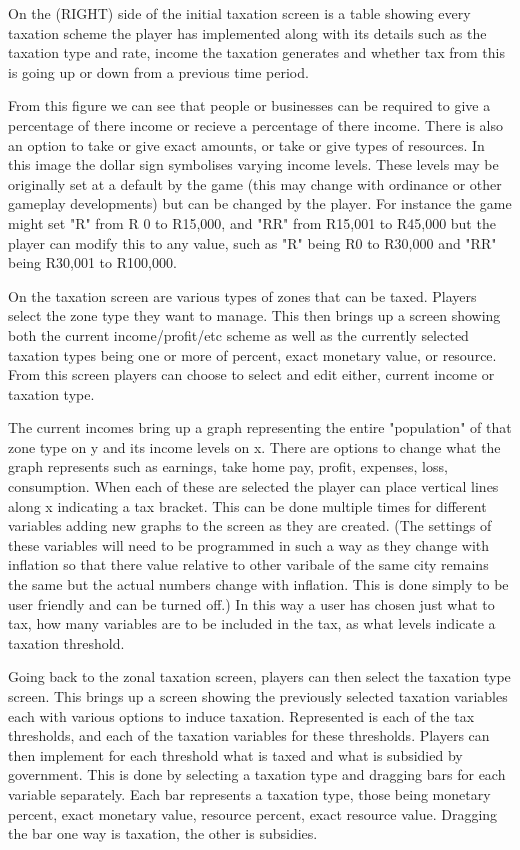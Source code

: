 On the (RIGHT) side of the initial taxation screen is a table showing every taxation scheme the player has implemented along with its details such as the taxation type and rate, income the taxation generates and whether tax from this is going up or down from a previous time period.



From this figure we can see that people or businesses can be required to give a percentage of there income or recieve a percentage of there income. There is also an option to take or give exact amounts, or take or give types of resources. In this image the dollar sign symbolises varying income levels. These levels may be originally set at a default by the game (this may change with ordinance or other gameplay developments) but can be changed by the player. For instance the game might set "R" from R 0 to R15,000, and "RR" from R15,001 to R45,000 but the player can modify this to any value, such as "R" being R0 to R30,000 and "RR" being R30,001 to R100,000. 

On the taxation screen are various types of zones that can be taxed. Players select the zone type they want to manage. This then brings up a screen showing both the current income/profit/etc scheme as well as the currently selected taxation types being one or more of percent, exact monetary value, or resource. 
From this screen players can choose to select and edit either, current income or taxation type.

The current incomes bring up a graph representing the entire "population" of that zone type on y and its income levels on x. There are options to change what the graph represents such as earnings, take home pay, profit, expenses, loss, consumption. When each of these are selected the player can place vertical lines along x indicating a tax bracket. This can be done multiple times for different variables adding new graphs to the screen as they are created. (The settings of these variables will need to be programmed in such a way as they change with inflation so that there value relative to other varibale of the same city remains the same but the actual numbers change with inflation. This is done simply to be user friendly and can be turned off.) In this way a user has chosen just what to tax, how many variables are to be included in the tax, as what levels indicate a taxation threshold.

Going back to the zonal taxation screen, players can then select the taxation type screen. This brings up a screen showing the previously selected taxation variables each with various options to induce taxation. Represented is each of the tax thresholds, and each of the taxation variables for these thresholds. Players can then implement for each threshold what is taxed and what is subsidied by government. This is done by selecting a taxation type and dragging bars for each variable separately. Each bar represents a taxation type, those being monetary percent, exact monetary value, resource percent, exact resource value. Dragging the bar one way is taxation, the other is subsidies.

